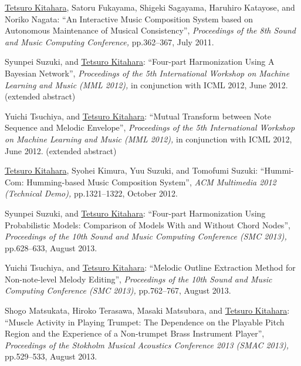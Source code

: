 \begin{Enumerate}
\item 
\underline{Tetsuro Kitahara}, 
Satoru Fukayama, 
Shigeki Sagayama, 
Haruhiro Katayose, 
and 
Noriko Nagata: 
    ``An Interactive Music Composition System based on Autonomous Maintenance of Musical Consistency'', 
    {\it Proceedings of the 8th Sound and Music Computing Conference,
    } pp.362--367, July 2011. 

\item 
Syunpei Suzuki, 
and 
\underline{Tetsuro Kitahara}: 
    ``Four-part Harmonization Using A Bayesian Network'', 
    {\it Proceedings of the 5th International Workshop on Machine Learning and Music (MML 2012),
    } in conjunction with ICML 2012, June 2012. 
(extended abstract)
\item 
Yuichi Tsuchiya, 
and 
\underline{Tetsuro Kitahara}: 
    ``Mutual Transform between Note Sequence and Melodic Envelope'', 
    {\it Proceedings of the 5th International Workshop on Machine Learning and Music (MML 2012),
    } in conjunction with ICML 2012, June 2012. 
(extended abstract)
\item 
\underline{Tetsuro Kitahara}, 
Syohei Kimura, 
Yuu Suzuki, 
and 
Tomofumi Suzuki: 
    ``Hummi-Com: Humming-based Music Composition System'', 
    {\it ACM Multimedia 2012 (Technical Demo),
    } pp.1321--1322, October 2012. 

\item 
Syunpei Suzuki, 
and 
\underline{Tetsuro Kitahara}: 
    ``Four-part Harmonization Using Probabilistic Models: Comparison of Models With and Without Chord Nodes'', 
    {\it Proceedings of the 10th Sound and Music Computing Conference (SMC 2013),
    } pp.628--633, August 2013. 

\item 
Yuichi Tsuchiya, 
and 
\underline{Tetsuro Kitahara}: 
    ``Melodic Outline Extraction Method for Non-note-level Melody Editing'', 
    {\it Proceedings of the 10th Sound and Music Computing Conference (SMC 2013),
    } pp.762--767, August 2013. 

\item 
Shogo Matsukata, 
Hiroko Terasawa, 
Masaki Matsubara, 
and 
\underline{Tetsuro Kitahara}: 
    ``Muscle Activity in Playing Trumpet: The Dependence on the Playable Pitch Region and the Experience of a Non-trumpet Brass Instrument Player'', 
    {\it Proceedings of the Stokholm Musical Acoustics Conference 2013 (SMAC 2013),
    } pp.529--533, August 2013. 


\end{Enumerate}
